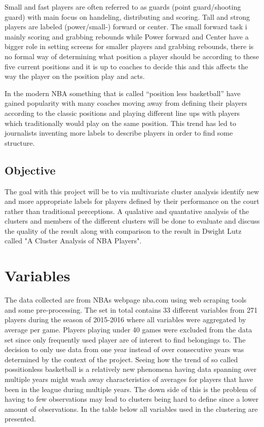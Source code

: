 \documentclass{article}
\begin{document}
Small and fast players are often referred to as guards (point guard/shooting guard) with main focus on handeling, distributing and scoring. Tall and strong players are labeled (power/small-) forward or center. The small forward task i mainly scoring and grabbing rebounds while Power forward and Center have a bigger role in setting screens for smaller players and grabbing rebounds, there is no formal way of determining what position a player should be according to these five current positions and it is up to coaches to decide this and this affects the way the player on the position play and acts.


In the modern NBA something that is called “position less basketball” have gained popularity with many coaches moving away from defining their players according to the classic positions and playing different line ups with players which traditionally would play on the same position. \cite{positonbasketball} This trend has led to journalists inventing more labels to describe players in order to find some structure.



\subsection{Objective}


The goal with this project will be to via multivariate cluster analysis identify new and more appropriate labels for players defined by their performance on the court rather than traditional perceptions. A qualative and quantative analysis of the clusters and members of the different clusters will be done to evaluate and discuss the quality of the result along with comparison to the result in Dwight Lutz called "A Cluster Analysis of NBA Players".



\section{Variables}

The data collected are from NBAs webpage nba.com using web scraping tools and some pre-processing. The set in total contains 33 different variables from 271 players during the season of 2015-2016 where all variables were aggregated by average per game. Players playing under 40 games were excluded from the data set since only frequently used player are of interest to find belongings to. The decision to only use data from one year instead of over consecutive years was determined by the context of the project. Seeing how the trend of so called possitionless basketball is a relatively new phenomena having data spanning over multiple years might wash away characteristics of averages for players that have been in the league during multiple years. The down side of this is the problem of having to few observations may lead to clusters being hard to define since a lower amount of observations. In the table below all variables used in the clustering are presented.
\end{document}
